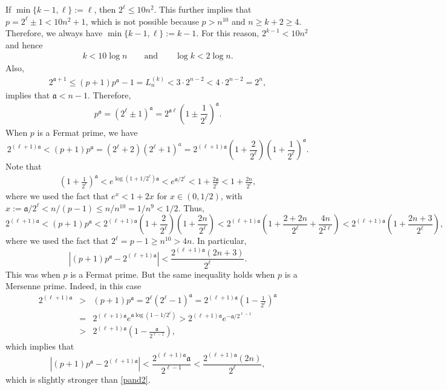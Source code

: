 \documentclass[11pt,a4paper]{article}
\numberwithin{equation}{section}
\numberwithin{table}{section}
\numberwithin{figure}{section}
\begin{document}
If $\min\{k-1,\ell\}:=\ell$, then $2^\ell \le 10n^2 $. This further implies that $p=2^\ell \pm 1 < 10n^2 +1$, which is not possible because $p>n^{10}$ and $n\ge k+2\ge 4$. Therefore, we always have $\min\{k-1,\ell\}:=k-1$. For this reason,
$2^{k-1} < 10n^2 $ and hence
\begin{align}\label{eq:log-k}
	k <10\log n \qquad \text{and} \qquad \log k < 2\log n.
\end{align}
Also, 
\begin{align*}
	2^{\mathfrak{a}+1} \le (p+1)p^\mathfrak{a}-1 = L_n^{(k)} < 3\cdot 2^{n-2} < 4\cdot 2^{n-2} = 2^n,
\end{align*}
implies that $\mathfrak{a} < n-1$. Therefore,
\begin{align*}
	p^\mathfrak{a} = (2^\ell \pm 1)^\mathfrak{a} = 2^{\mathfrak{a}\ell}\left(1 \pm \dfrac{1}{2^\ell}\right)^\mathfrak{a}.
\end{align*}
When $p$ is a Fermat prime, we have 
$$
2^{(\ell+1)\mathfrak{a}}<(p+1)p^{\mathfrak{a}}=(2^\ell+2)(2^{\ell}+1)^a=2^{(\ell+1)\mathfrak{a}}\left(1+\frac{2}{2^{\ell}}\right)\left(1+\frac{1}{2^{\ell}}\right)^{\mathfrak{a}}.
$$
Note that
\begin{eqnarray*}
\left(1+\frac{1}{2^{\ell}}\right)^{\mathfrak{a}}<e^{\log(1+1/2^{\ell})\mathfrak{a}}<e^{{\mathfrak{a}}/2^{\ell}}<1+\frac{2{\mathfrak{a}}}{2^{\ell}}<1+\frac{2n}{2^{\ell}},
\end{eqnarray*}
where we used the fact that $e^x<1+2x$ for $x\in (0,1/2)$, with $x:={\mathfrak{a}}/2^{\ell}<n/(p-1)\le n/n^{10}=1/n^9<1/2$. Thus, 
$$
2^{(\ell+1)\mathfrak{a}}<(p+1)p^{\mathfrak{a}}<2^{(\ell+1)\mathfrak{a}}\left(1+\frac{2}{2^{\ell}}\right)\left(1+\frac{2n}{2^{\ell}}\right)<2^{(\ell+1)\mathfrak{a}}\left(1+\frac{2+2n}{2^{\ell}}+\frac{4n}{2^{2\ell}}\right)<2^{(\ell+1)\mathfrak{a}}\left(1+\frac{2n+3}{2^{\ell}}\right),
$$
where we used the fact that $2^{\ell}=p-1\ge n^{10}>4n$. In particular, 
\begin{equation}
\label{pand2}
\left|(p+1)p^{\mathfrak{a}}-2^{(\ell+1)\mathfrak{a}}\right|<\frac{2^{(\ell+1)\mathfrak{a}}(2n+3)}{2^{\ell}}.
\end{equation}
This was when $p$ is a Fermat prime. But the same inequality holds when $p$ is a Mersenne prime. Indeed, in this case 
\begin{eqnarray*}
2^{(\ell+1)\mathfrak{a}} & > & (p+1)p^{\mathfrak{a}}=2^{\ell} (2^{\ell}-1)^{\mathfrak{a}}=2^{(\ell+1)\mathfrak{a}}\left(1-\frac{1}{2^{\ell}}\right)^{\mathfrak{a}}\\
& = &
2^{(\ell+1)\mathfrak{a}}e^{\mathfrak{a}\log(1-1/2^{\ell})}>2^{(\ell+1)\mathfrak{a}}e^{-\mathfrak{a}/2^{\ell-1}}\\
& > & 2^{(\ell+1)\mathfrak{a}}\left(1-\frac{\mathfrak{a}}{2^{\ell-1}}\right),
\end{eqnarray*}
which implies that 
$$
\left|(p+1)p^{\mathfrak{a}}-2^{(\ell+1)\mathfrak{a}}\right|<\frac{2^{(\ell+1)\mathfrak{a}} {\mathfrak{a}}}{2^{\ell-1}}<\frac{2^{(\ell+1)\mathfrak{a}} (2n)}{2^{\ell}},
$$
which is slightly stronger than \eqref{pand2}.
\end{document}
